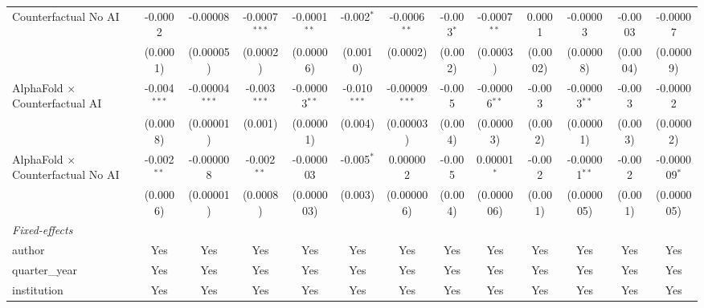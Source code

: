 \begin{tabular}{lcccccccccccc}
   Counterfactual No AI                     & -0.0002        & -0.00008         & -0.0007$^{***}$ & -0.0001$^{**}$  & -0.002$^{*}$   & -0.0006$^{**}$   & -0.003$^{*}$  & -0.0007$^{**}$  & 0.0001        & -0.00003        & -0.0003       & -0.00007\\   
                                            & (0.0001)       & (0.00005)        & (0.0002)        & (0.00006)       & (0.0010)       & (0.0002)         & (0.002)       & (0.0003)        & (0.0002)      & (0.00008)       & (0.0004)      & (0.00009)\\   
   AlphaFold $\times$ Counterfactual AI     & -0.004$^{***}$ & -0.00004$^{***}$ & -0.003$^{***}$  & -0.00003$^{**}$ & -0.010$^{***}$ & -0.00009$^{***}$ & -0.005        & -0.00006$^{**}$ & -0.003        & -0.00003$^{**}$ & -0.003        & -0.00002\\   
                                            & (0.0008)       & (0.00001)        & (0.001)         & (0.00001)       & (0.004)        & (0.00003)        & (0.004)       & (0.00003)       & (0.002)       & (0.00001)       & (0.003)       & (0.00002)\\   
   AlphaFold $\times$ Counterfactual No AI  & -0.002$^{**}$  & -0.000008        & -0.002$^{**}$   & -0.000003       & -0.005$^{*}$   & 0.000002         & -0.005        & 0.00001$^{*}$   & -0.002        & -0.00001$^{**}$ & -0.002        & -0.000009$^{*}$\\   
                                            & (0.0006)       & (0.00001)        & (0.0008)        & (0.000003)      & (0.003)        & (0.000006)       & (0.004)       & (0.000006)      & (0.001)       & (0.000005)      & (0.001)       & (0.000005)\\   
   \midrule
   \emph{Fixed-effects}\\
   author                                   & Yes            & Yes              & Yes             & Yes             & Yes            & Yes              & Yes           & Yes             & Yes           & Yes             & Yes           & Yes\\  
   quarter\_year                            & Yes            & Yes              & Yes             & Yes             & Yes            & Yes              & Yes           & Yes             & Yes           & Yes             & Yes           & Yes\\  
   institution                              & Yes            & Yes              & Yes             & Yes             & Yes            & Yes              & Yes           & Yes             & Yes           & Yes             & Yes           & Yes\\  

\end{tabular}
